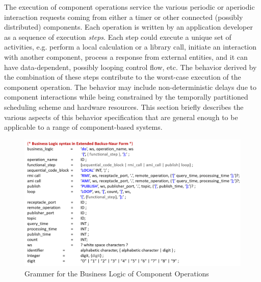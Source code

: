 The execution of component operations service the various periodic or aperiodic interaction requests coming from either a timer or other connected (possibly distributed) components. Each operation is written by an application developer as a sequence of execution \emph{steps}. Each step could execute a unique set of activities, e.g. perform a local calculation or a library call, initiate an interaction with another component, process a response from external entities, and it can have data-dependent, possibly looping control flow, etc. The behavior derived by the combination of these steps contribute to the worst-case execution of the component operation. The behavior may include non-deterministic delays due to component interactions while being constrained by the  temporally partitioned scheduling scheme and hardware resources. This section briefly describes the various aspects of this behavior specification that are general enough to be applicable to a range of component-based systems.

\begin{figure}[ht]
	\centering
	\includegraphics[width=\textwidth]{./img/BL-EBNF}
	\caption{Grammer for the Business Logic of Component Operations}
	\label{fig:ebnf}
\end{figure}


